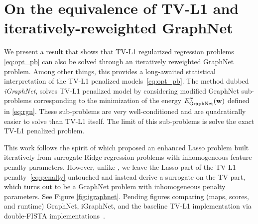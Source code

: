 \chapter{On the equivalence of TV-L1 and iteratively-reweighted
  GraphNet}\label{chap:igraphnet}

\minitoc

We present a result that shows that TV-L1 regularized regression problems \eqref{eq:opt_pb} can also be solved through an iteratively reweighted GraphNet problem. 
%
Among other things, this provides a long-awaited statistical interpretation of the TV-L1 penalized models~\eqref{eq:opt_pb}.
The method dubbed \textit{iGraphNet}, solves TV-L1 penalized model by considering modified GraphNet sub-problems corresponding to the minimization of the energy
$E_{\text{GraphNet}}^{\boldsymbol{\gamma}}(\mathbf{w})$ defined in \eqref{eq:rgn}. These sub-problems  are very well-conditioned and are quadratically easier to solve than TV-L1 itself.
The limit of this sub-problems is solve the exact TV-L1 penalized problem.

This work follows the spirit of \citep{candes2007enhancing} which proposed an enhanced Lasso problem built iteratively from surrogate Ridge regression problems with inhomogeneous feature penalty parameters. However, unlike \citep{candes2007enhancing}, we leave the Lasso part of the TV-L1 penalty~\eqref{eq:penalty}
untouched and instead derive a surrogate on the TV part, which turns out to be a GraphNet problem with inhomogeneous penalty parameters.
See Figure \ref{fig:igraphnet}. Pending figures comparing (maps, scores, and
runtime) GraphNet, iGraphNet, and the baseline TV-L1 implementation via double-FISTA implementations~\citep{dohmatob2014benchmarking,varoquaux2015faasta}.

